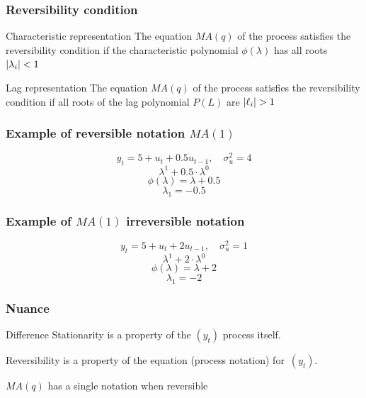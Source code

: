 %	







\begin{frame}
	\frametitle{Reversibility condition}
	
	\begin{block}{Characteristic representation}
		The equation $MA(q)$ of the process satisfies the reversibility condition if
		the characteristic polynomial $\phi(\lambda)$ has all roots $\abs{\lambda_i} <1$
	\end{block}
	
	\pause
	
	\begin{block}{Lag representation}
		The equation $MA(q)$ of the process satisfies the reversibility condition if all roots  of 
		the lag polynomial $P(L)$ are  $\abs{\ell_i} >1$
	\end{block}
	
	
\end{frame}

\begin{frame}
	\frametitle{Example of reversible notation $MA(1)$}
	
	\[
	y_t = 5 + u_t + 0.5 u_{t-1}, \quad \sigma^2_u = 4
	\]
	\pause
	\[
	\lambda^1 + 0.5 \cdot \lambda^0
	\]
	\[
	\phi(\lambda) = \lambda + 0.5
	\]
	\pause
	\[
	\lambda_1 = -0.5
	\]
	
\end{frame}


\begin{frame}
	\frametitle{Example of $MA(1)$ irreversible notation}
	
	\[
	y_t = 5 + u_t + 2 u_{t-1}, \quad \sigma^2_u = 1
	\]
	\pause
	\[
	\lambda^1 + 2 \cdot \lambda^0
	\]
	\[
	\phi(\lambda) = \lambda + 2
	\]
	\pause
	\[
	\lambda_1 = -2
	\]
\end{frame}


\begin{frame}
	\frametitle{Nuance}
	
	\begin{block}{Difference}
		Stationarity is a property of the $(y_t)$ process itself.
		
		Reversibility is a property of the equation (process  notation) for~$(y_t)$.
	\end{block}
	
	\pause
    $MA(q)$ has a single notation when reversible
	
\end{frame}



